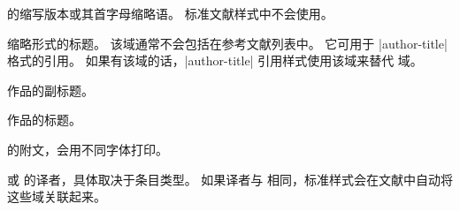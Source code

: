 \begin{fieldlist}

 的缩写版本或其首字母缩略语。
标准文献样式中不会使用。




缩略形式的标题。
该域通常不会包括在参考文献列表中。
它可用于 |author-title| 格式的引用。
如果有该域的话，|author-title| 引用样式使用该域来替代  域。




作品的副标题。




作品的标题。




 的附文，会用不同字体打印。




 或  的译者，具体取决于条目类型。
如果译者与  相同，标准样式会在文献中自动将这些域关联起来。





\end{fieldlist}
